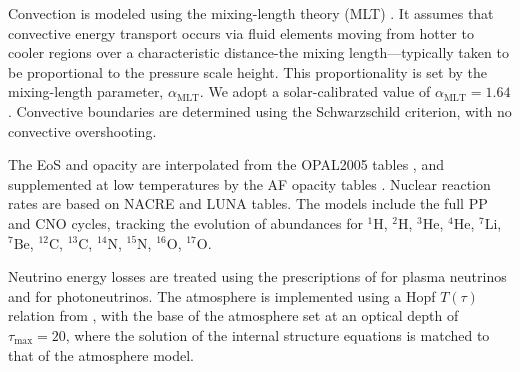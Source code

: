 \documentclass[12pt,a4paper]{article}
\newcommand{\mr}{\mathrm}
\begin{document}
Convection is modeled using the mixing-length theory (MLT) \parencite{CoxGiuli1968a}. It assumes that convective energy transport occurs via fluid elements moving from hotter to cooler regions over a characteristic distance-the mixing length—typically taken to be proportional to the pressure scale height. This proportionality is set by the mixing-length parameter, $\alpha_\mr{MLT}$. We adopt a solar-calibrated value of $\alpha_\mr{MLT} = 1.64$. Convective boundaries are determined using the Schwarzschild criterion, with no convective overshooting.

The EoS and opacity are interpolated from the OPAL2005 tables \parencite{RogersIglesias1992,IglesiasRogers1996,RogersNayfonov2002}, and supplemented at low temperatures by the AF opacity tables \parencite{FergusonEtAl2005}. Nuclear reaction rates are based on NACRE \parencite{AikawaEtAl2006} and LUNA \parencite{BrogginiEtAl2018} tables. The models include the full PP and CNO cycles, tracking the evolution of abundances for $^{1}\mr{H}$, $^{2}\mr{H}$, $^{3}\mr{He}$, $^{4}\mr{He}$, $^{7}\mr{Li}$, $^{7}\mr{Be}$, $^{12}\mr{C}$, $^{13}\mr{C}$, $^{14}\mr{N}$, $^{15}\mr{N}$, $^{16}\mr{O}$, $^{17}\mr{O}$.

Neutrino energy losses are treated using the prescriptions of \textcite{HaftEtAl1994} for plasma neutrinos and \textcite{Weigert1966} for photoneutrinos. The atmosphere is implemented using a Hopf $T(\tau)$ relation from \textcite{HubenyMihalas2015}, with the base of the atmosphere set at an optical depth of $\tau_{\max} = 20$, where the solution of the internal structure equations is matched to that of the atmosphere model.
\end{document}
